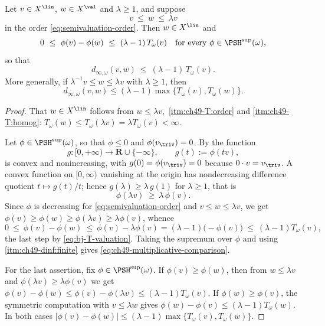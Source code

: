 \begin{lemma}
\label{lem:ch49-multiplicative-comparison}
Let $v\in X^{\lin}$, $w\in X^{\val}$ and $\lambda\ge1$, and suppose
\[
 v\ \le\ w\ \le\ \lambda v
\]
in the order \eqref{eq:semivaluation-order}.  Then $w\in X^{\lin}$ and
\[
 0\ \le\ \phi(v)-\phi(w)\ \le\ (\lambda-1)\,T_\omega(v)
 \quad\text{for every }\phi\in\PSH^{\sup}(\omega),
\]
so that
\[
 d_{\infty,\omega}(v,w)\ \le\ (\lambda-1)\,T_\omega(v).
\tag{49.13}\label{eq:ch49-multiplicative-comparison}
\]
More generally, if $\lambda^{-1}v\le w\le\lambda v$ with
$\lambda\ge1$, then
\[
 d_{\infty,\omega}(v,w)\le(\lambda-1)\max\{T_\omega(v),T_\omega(w)\}.
\]
\end{lemma}

\begin{proof}
That $w\in X^{\lin}$ follows from $w\le\lambda v$,
\,\cref{itm:ch49-T:order} and
\cref{itm:ch49-T:homog}: $T_\omega(w)\le T_\omega(\lambda v)
=\lambda T_\omega(v)<\infty$.

Let $\phi\in\PSH^{\sup}(\omega)$, so that $\phi\le0$ and
$\phi(v_{\triv})=0$.  By  the function
\[
 g:[0,+\infty)\longrightarrow\mathbf R\cup\{-\infty\},
 \qquad g(t):=\phi(tv),
\]
is convex and nonincreasing, with $g(0)=\phi(v_{\triv})=0$ because
$0\cdot v=v_{\triv}$.  A convex function on $[0,\infty)$ vanishing at
the origin has nondecreasing difference quotient $t\mapsto g(t)/t$;
hence $g(\lambda)\ge\lambda\,g(1)$ for $\lambda\ge1$, that is
\[
 \phi(\lambda v)\ \ge\ \lambda\,\phi(v).
\]
Since $\phi$ is decreasing for \eqref{eq:semivaluation-order} and
$v\le w\le\lambda v$, we get
$\phi(v)\ge\phi(w)\ge\phi(\lambda v)\ge\lambda\phi(v)$, whence
\[
 0\ \le\ \phi(v)-\phi(w)\ \le\ \phi(v)-\lambda\phi(v)
 =(\lambda-1)\bigl(-\phi(v)\bigr)\ \le\ (\lambda-1)T_\omega(v),
\]
the last step by \eqref{eq:bj-T-valuation}.  Taking the supremum over
$\phi$ and using
\,\cref{itm:ch49-dinf:finite} gives
\eqref{eq:ch49-multiplicative-comparison}.

For the last assertion, fix $\phi\in\PSH^{\sup}(\omega)$.  If
$\phi(v)\ge\phi(w)$, then from $w\le\lambda v$ and
$\phi(\lambda v)\ge\lambda\phi(v)$ we get
$\phi(v)-\phi(w)\le\phi(v)-\phi(\lambda v)\le(\lambda-1)T_\omega(v)$.  If
$\phi(w)\ge\phi(v)$, the symmetric computation with $v\le\lambda w$
gives $\phi(w)-\phi(v)\le(\lambda-1)T_\omega(w)$.  In both cases
$|\phi(v)-\phi(w)|\le(\lambda-1)\max\{T_\omega(v),T_\omega(w)\}$.
\end{proof}

